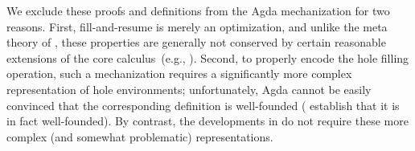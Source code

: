 
We exclude these proofs and definitions from the Agda mechanization
for two reasons.
%
First, fill-and-resume is merely an optimization, and unlike the meta
theory of , these properties are generally not
conserved by certain reasonable extensions of the core
calculus~(e.g., ).
%
Second, to properly encode the hole filling operation, such a
mechanization requires a significantly more complex representation of
hole environments; unfortunately, Agda cannot be easily convinced that
the corresponding definition is well-founded (\citet{Nanevski2008}
establish that it is in fact well-founded).
%
By contrast, the developments in  do not require
these more complex (and somewhat problematic) representations.

\begin{comment}

\begin{theorem}[Maximum Informativity]
If the expansion produces $t1$, and there exists another possible type choice
$t2$, then $t1 \sim t2$ and $t1 JOIN t2 = t1$
\end{theorem}\footnote{idea is that special casing the holes in EANEHole gives you ``the
most descriptive hole types'' for some sense of what that means -- they'd
all just be hole other wise. from Matt:
\begin{quote}
It sounds like we need a something akin to an abstract domain (a lattice),
where hole has the least information, and a fully-defined type (without
holes) has the most information.  You can imagine that this lattice really
expands the existing definition we have of type consistency, which is
merely the predicate that says whether two types are comparable
(“join-able”) in this lattice.  lattice join is the operation that goes
through the structure of two (consistent) types, and chooses the structure
that is more defined (i.e., non-hole, if given the choice between hole and
non-hole).

The rule choosenonhole below is the expansion of this consistency rule that
we already have (hole consistent with everything)
\end{quote}}

\begin{verbatim}
t not hole
-------------------- :: choose-non-hole
hole JOIN t  = t
\end{verbatim}
\begin{verbatim}
------------ :: hole-consistent-with-everything
hole ~ t
\end{verbatim}

\end{comment}
